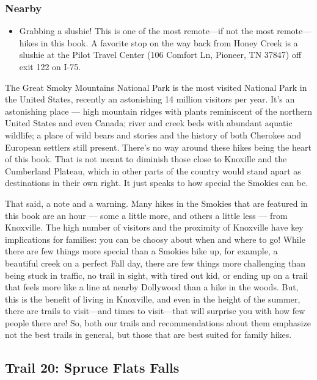 \documentclass[
  letterpaper,
  DIV=11,
  numbers=noendperiod]{scrartcl}
\providecommand{\tightlist}{%
  \setlength{\itemsep}{0pt}\setlength{\parskip}{0pt}}\usepackage{longtable,booktabs,array}
\begin{document}
\hypertarget{nearby-18}{%
\subsubsection{Nearby}\label{nearby-18}}

\begin{itemize}
\tightlist
\item
  Grabbing a slushie! This is one of the most remote---if not the most
  remote---hikes in this book. A favorite stop on the way back from
  Honey Creek is a slushie at the Pilot Travel Center (106 Comfort Ln,
  Pioneer, TN 37847) off exit 122 on I-75.
\end{itemize}

The Great Smoky Mountains National Park is the most visited National
Park in the United States, recently an astonishing 14 million visitors
per year. It's an astonishing place --- high mountain ridges with plants
reminiscent of the northern United States and even Canada; river and
creek beds with abundant aquatic wildlife; a place of wild bears and
stories and the history of both Cherokee and European settlers still
present. There's no way around these hikes being the heart of this book.
That is not meant to diminish those close to Knoxille and the Cumberland
Plateau, which in other parts of the country would stand apart as
destinations in their own right. It just speaks to how special the
Smokies can be.

That said, a note and a warning. Many hikes in the Smokies that are
featured in this book are an hour --- some a little more, and others a
little less --- from Knoxville. The high number of visitors and the
proximity of Knoxville have key implications for families: you can be
choosy about when and where to go! While there are few things more
special than a Smokies hike up, for example, a beautiful creek on a
perfect Fall day, there are few things more challenging than being stuck
in traffic, no trail in sight, with tired out kid, or ending up on a
trail that feels more like a line at nearby Dollywood than a hike in the
woods. But, this is the benefit of living in Knoxville, and even in the
height of the summer, there are trails to visit---and times to
visit---that will surprise you with how few people there are! So, both
our trails and recommendations about them emphasize not the best trails
in general, but those that are best suited for family hikes.

\hypertarget{trail-20-spruce-flats-falls}{%
\subsection{Trail 20: Spruce Flats
Falls}\label{trail-20-spruce-flats-falls}}
\end{document}
